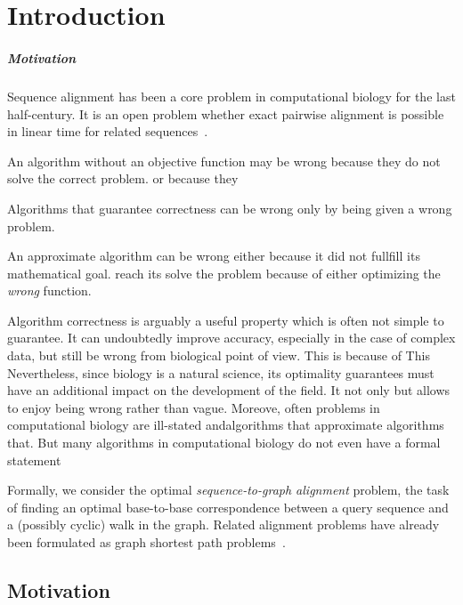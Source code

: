 \graphicspath{{\dir/}}


\chapter{Introduction} \label{ch:introduction}

\paragraph{Motivation}
Sequence alignment has been a core problem in computational biology for the last
half-century. It is an open problem whether exact pairwise alignment is possible
in linear time for related sequences~\citep{medvedev2022theoretical}.

An algorithm without an objective function may be wrong because they do not
solve the correct problem. or because they 

Algorithms that guarantee correctness can be wrong only by being given a wrong problem.

An approximate algorithm can be wrong either because it did not fullfill its
mathematical goal. reach its solve the problem because of either optimizing the
\emph{wrong} function.

Algorithm correctness is arguably a useful property which is often not simple to
guarantee. It can undoubtedly improve accuracy, especially in the case of
complex data, but still be wrong from biological point of view. This is because
of  This Nevertheless, since biology is a natural science, its  optimality
guarantees must have an additional impact on the development of the field. It
not only but allows to enjoy being wrong rather than vague. Moreove, often
problems in computational biology are ill-stated andalgorithms that approximate
algorithms that. But many algorithms in computational biology do not even have a
formal statement 

Formally, we consider the optimal \emph{sequence-to-graph alignment} problem,
the task of finding an optimal base-to-base correspondence between a query
sequence and a (possibly cyclic) walk in the graph. Related alignment problems
have already been formulated as graph shortest path
problems~\cite{jain_complexity_2019}.

\section{Motivation}


